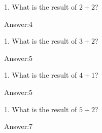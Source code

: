 \documentclass{article}
\begin{document}
1. What is the result of $2+2$?
\par Answer:4


1. What is the result of $3+2$?
\par Answer:5


1. What is the result of $4+1$?
\par Answer:5


1. What is the result of $5+2$?
\par Answer:7
\end{document}
